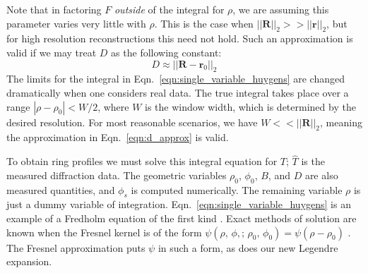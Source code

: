 \documentclass{article}
\theoremstyle{plain}
\begin{document}
        Note that in factoring $F$ \textit{outside} of the integral for
        $\rho$, we are assuming this parameter varies very little with $\rho$.
        This is the case when $||\mathbf{R}||_{2}>>||\mathbf{r}||_{2}$, but
        for high resolution reconstructions this need not hold.
        Such an approximation is valid if we may
        treat $D$ as the following constant:
        \begin{equation}
            \label{eqn:d_approx}
            D\approx||\mathbf{R}-\mathbf{r}_{0}||_{2}
        \end{equation}
        The limits for the integral in Eqn.~\ref{eqn:single_variable_huygens}
        are changed dramatically when one considers real data. The true
        integral takes place over a range $|\rho-\rho_{0}|<W/2$, where $W$ is
        the window width, which is determined by the desired resolution.
        For most reasonable scenarios, we have $W<<||\mathbf{R}||_{2}$,
        meaning the approximation in Eqn.~\ref{eqn:d_approx} is valid.
        \par\hfill\par
        To obtain ring profiles we must solve this integral equation for $T$;
        $\hat{T}$ is the measured diffraction data.
        The geometric variables $\rho_{0}$, $\phi_{0}$, $B$, and $D$ are also
        measured quantities, and $\phi_{s}$ is computed numerically.
        The remaining variable $\rho$ is just a dummy variable of integration.
        Eqn.~\ref{eqn:single_variable_huygens} is an example of a
        Fredholm equation of the first kind \cite[Ch.~18]{NumericalRecipes}.
        Exact methods of solution are known when the Fresnel kernel is of the
        form $\psi(\rho,\,\phi,;\,\rho_{0},\,\phi_{0})=\psi(\rho-\rho_{0})$
        \cite[Ch.~21]{ArfkenWeberMathematicalPhysics}. The Fresnel approximation
        puts $\psi$ in such a form, as does our new Legendre expansion.
\end{document}

